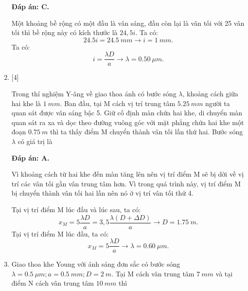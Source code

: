 \begin{enumerate}[label=\bfseries Câu \arabic*:]
	\loigiai
	{		\textbf{Đáp án: C.}
		
		Một khoảng bề rộng có một đầu là vân sáng, đầu còn lại là vân tối với 25 vân tối thì bề rộng này có kích thước là $24,5i$. Ta có:
		$$
		\num{24,5}i = \SI{24,5}{mm} \rightarrow i = \SI{1}{mm}.
		$$
		Ta có:
		$$
		i = \dfrac{\lambda D}{a} \rightarrow \lambda = \SI{0,50}{\mu m}.
		$$
	}
	
	\item {} [4]
	\cauhoi
	{Trong thí nghiệm Y-âng về giao thoa ánh có bước sóng $\lambda$, khoảng cách giữa hai khe là $\SI{1}{mm}$. Ban đầu, tại M cách vị trí trung tâm $\SI{5,25}{mm}$ người ta quan sát được vân sáng bậc 5. Giữ cố định màn chứa hai khe, di chuyển màn quan sát ra xa và dọc theo đường vuông góc với mặt phẳng chứa hai khe một đoạn $\SI{0,75}{m}$ thì ta thấy điểm M chuyển thành vân tối lần thứ hai. Bước sóng $\lambda$ có giá trị là
	}
	
	\loigiai
	{		\textbf{Đáp án: A.}
		
		Vì khoảng cách từ hai khe đến màn tăng lên nên vị trí điểm M sẽ bị dời về vị trí các vân tối gần vân trung tâm hơn. Vì trong quá trình này, vị trí điểm M bị chuyển thành vân tối hai lần nên nó ở vị trí vân tối thứ 4.
		
		Tại vị trí điểm M lúc đầu và lúc sau, ta có:
		$$
		x_{M} = 5 \dfrac{\lambda D}{a} = 3,5 \dfrac{\lambda (D + \Delta D)}{a} \rightarrow D = \SI{1,75}{m}.
		$$
		Tại vị trí điểm M lúc đầu, ta có:
		$$
		x_{M} = 5 \dfrac{\lambda D}{a} \rightarrow \lambda = \SI{0,60}{\mu m}.
		$$
	}
	\item {} 
	\cauhoi
	{Giao thoa khe Young với ánh sáng đơn sắc có bước sóng $\lambda = \SI{0,5}{\mu m}; a = \SI{0,5}{mm}; D = \SI{2}{m}$. Tại M cách vân trung tâm $\SI{7}{mm}$ và tại điểm N cách vân trung tâm $\SI{10}{mm}$ thì
		
		}
\end{enumerate}
